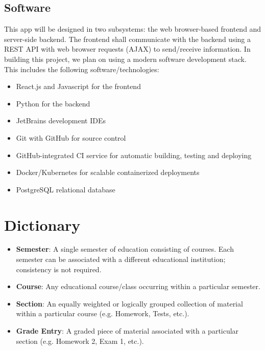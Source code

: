 \documentclass[12pt]{article}
\begin{document}
\subsection{Software}
This app will be designed in two subsystems: the web browser-based frontend and server-side backend.
The frontend shall communicate with the backend using a REST API with web browser requests (AJAX) to
send/receive information. In building this project, we plan on using a modern software development
stack. This includes the following software/technologies:

\begin{itemize}
    \item React.js and Javascript for the frontend
    \item Python for the backend
    \item JetBrains development IDEs
    \item Git with GitHub for source control
    \item GitHub-integrated CI service for automatic building, testing and deploying
    \item Docker/Kubernetes for scalable containerized deployments
    \item PostgreSQL relational database
\end{itemize}

\section{Dictionary}
\begin{itemize}
    \item \textbf{Semester}: A single semester of education consisting of courses. Each semester can
    be associated with a different educational institution; consistency is not required.
    \item \textbf{Course}: Any educational course/class occurring within a particular semester.
    \item \textbf{Section}: An equally weighted or logically grouped collection of material within a
    particular course (e.g. Homework, Tests, etc.).
    \item \textbf{Grade Entry}: A graded piece of material associated with a particular section 
    (e.g. Homework 2, Exam 1, etc.).
\end{itemize}
\end{document}
